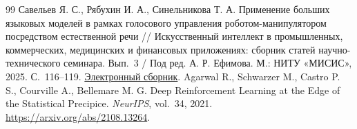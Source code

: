 \documentclass{misisarticle}
\begin{document}
\begin{thebibliography}{99}
Савельев Я. С., Рябухин И. А., Синельникова Т. А. Применение больших языковых моделей в рамках голосового управления роботом-манипулятором посредством естественной речи // Искусственный интеллект в промышленных, коммерческих, медицинских и финансовых приложениях: сборник статей научно-технического семинара. Вып.~3 / Под ред. А. Р. Ефимова. М.: НИТУ «МИСИС», 2025. С.~116--119. \href{https://misis.ru/files/-/7030ef7ab572d5227e50a55006446a76/kik_2024_2.pdf}{Электронный сборник}.
Agarwal R., Schwarzer M., Castro P. S., Courville A., Bellemare M. G. Deep Reinforcement Learning at the Edge of the Statistical Precipice. \textit{NeurIPS}, vol.~34, 2021. \url{https://arxiv.org/abs/2108.13264}.
\end{thebibliography}
\end{document}
